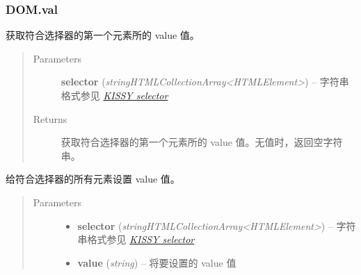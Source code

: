 \documentclass[letterpaper,10pt,english]{sphinxmanual}
\begin{document}
\subsubsection{DOM.val}
\label{api/core/dom/val:dom-val}\label{api/core/dom/val::doc}

\begin{fulllineitems}
\label{api/core/dom/val:DOM.val}
获取符合选择器的第一个元素所的 value 值。
\begin{quote}\begin{description}
\item[{Parameters}] \leavevmode
\textbf{selector} (\emph{string\textbar{}HTMLCollection\textbar{}Array\textless{}HTMLElement\textgreater{}}) -- 字符串格式参见 {\hyperref[api/core/dom/selector:dom-selector]{\emph{KISSY selector}}}

\item[{Returns}] \leavevmode
获取符合选择器的第一个元素所的 value 值。无值时，返回空字符串。

\end{description}\end{quote}

\end{fulllineitems}



\begin{fulllineitems}
给符合选择器的所有元素设置 value 值。
\begin{quote}\begin{description}
\item[{Parameters}] \leavevmode\begin{itemize}
\item {}
\textbf{selector} (\emph{string\textbar{}HTMLCollection\textbar{}Array\textless{}HTMLElement\textgreater{}}) -- 字符串格式参见 {\hyperref[api/core/dom/selector:dom-selector]{\emph{KISSY selector}}}

\item {}
\textbf{value} (\emph{string}) -- 将要设置的 value 值

\end{itemize}

\end{description}\end{quote}

\end{fulllineitems}
\end{document}
